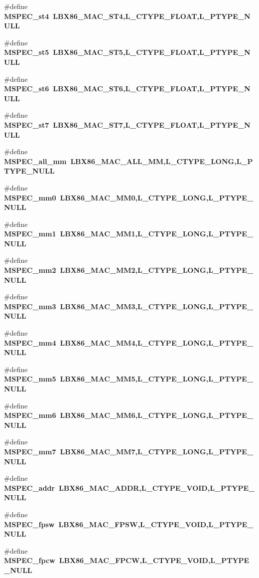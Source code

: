 \begin{CompactItemize}
\item 
\#define \bf{MSPEC\_\-st4}~LBX86\_\-MAC\_\-ST4,L\_\-CTYPE\_\-FLOAT,L\_\-PTYPE\_\-NULL
\item 
\#define \bf{MSPEC\_\-st5}~LBX86\_\-MAC\_\-ST5,L\_\-CTYPE\_\-FLOAT,L\_\-PTYPE\_\-NULL
\item 
\#define \bf{MSPEC\_\-st6}~LBX86\_\-MAC\_\-ST6,L\_\-CTYPE\_\-FLOAT,L\_\-PTYPE\_\-NULL
\item 
\#define \bf{MSPEC\_\-st7}~LBX86\_\-MAC\_\-ST7,L\_\-CTYPE\_\-FLOAT,L\_\-PTYPE\_\-NULL
\item 
\#define \bf{MSPEC\_\-all\_\-mm}~LBX86\_\-MAC\_\-ALL\_\-MM,L\_\-CTYPE\_\-LONG,L\_\-PTYPE\_\-NULL
\item 
\#define \bf{MSPEC\_\-mm0}~LBX86\_\-MAC\_\-MM0,L\_\-CTYPE\_\-LONG,L\_\-PTYPE\_\-NULL
\item 
\#define \bf{MSPEC\_\-mm1}~LBX86\_\-MAC\_\-MM1,L\_\-CTYPE\_\-LONG,L\_\-PTYPE\_\-NULL
\item 
\#define \bf{MSPEC\_\-mm2}~LBX86\_\-MAC\_\-MM2,L\_\-CTYPE\_\-LONG,L\_\-PTYPE\_\-NULL
\item 
\#define \bf{MSPEC\_\-mm3}~LBX86\_\-MAC\_\-MM3,L\_\-CTYPE\_\-LONG,L\_\-PTYPE\_\-NULL
\item 
\#define \bf{MSPEC\_\-mm4}~LBX86\_\-MAC\_\-MM4,L\_\-CTYPE\_\-LONG,L\_\-PTYPE\_\-NULL
\item 
\#define \bf{MSPEC\_\-mm5}~LBX86\_\-MAC\_\-MM5,L\_\-CTYPE\_\-LONG,L\_\-PTYPE\_\-NULL
\item 
\#define \bf{MSPEC\_\-mm6}~LBX86\_\-MAC\_\-MM6,L\_\-CTYPE\_\-LONG,L\_\-PTYPE\_\-NULL
\item 
\#define \bf{MSPEC\_\-mm7}~LBX86\_\-MAC\_\-MM7,L\_\-CTYPE\_\-LONG,L\_\-PTYPE\_\-NULL
\item 
\#define \bf{MSPEC\_\-addr}~LBX86\_\-MAC\_\-ADDR,L\_\-CTYPE\_\-VOID,L\_\-PTYPE\_\-NULL
\item 
\#define \bf{MSPEC\_\-fpsw}~LBX86\_\-MAC\_\-FPSW,L\_\-CTYPE\_\-VOID,L\_\-PTYPE\_\-NULL
\item 
\#define \bf{MSPEC\_\-fpcw}~LBX86\_\-MAC\_\-FPCW,L\_\-CTYPE\_\-VOID,L\_\-PTYPE\_\-NULL
\end{CompactItemize}
